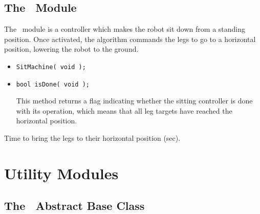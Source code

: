 \subsection{The \SitMachine\ Module}
\label{sec:sit_machine}

\begin{moduleheader}
\classname{\SitMachine} \mline
\modulebase{\StateMachine} \mline
{} \mline
{}
\end{moduleheader}

The \SitMachine\ module is a controller which makes the robot sit down from
a standing position. Once activated, the algorithm commands the legs to go
to a horizontal position, lowering the robot to the ground. \\

\constructors

\begin{itemize}
\item{\tt SitMachine( void ); }
\end{itemize}

\localinterface

\begin{itemize}
\item{\tt bool isDone( void ); } \par
This method returns a flag indicating whether the sitting controller
is done with its operation, which means that all leg targets have
reached the horizontal position.
\end{itemize}

\configsymbols

\begin{itemize}
\par
Time to bring the legs to their horizontal position (sec).
\end{itemize}

\section{Utility Modules}

\subsection{The \DataLogger\ Abstract Base Class}

\begin{moduleheader}
\classname{\DataLogger} \mline
\modulebase{\Module} \mline
{}
\end{moduleheader}

